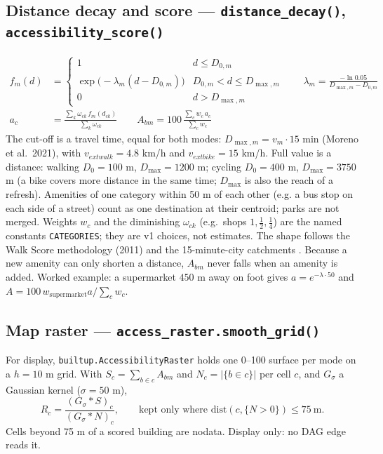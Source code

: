 \documentclass[11pt]{article}
\newcommand{\code}[1]{\texttt{#1}}
\begin{document}
\subsection{Distance decay and score --- \code{distance\_decay()}, \code{accessibility\_score()}}
\begin{align}
  f_m(d) &= \begin{cases} 1 & d \le D_{0,m} \\ \exp\!\big(-\lambda_m (d - D_{0,m})\big) & D_{0,m} < d \le D_{\max,m} \\ 0 & d > D_{\max,m} \end{cases}
  \qquad \lambda_m = \frac{-\ln 0.05}{D_{\max,m} - D_{0,m}} \\
  a_c &= \frac{\sum_{k} \omega_{ck}\, f_m(d_{ck})}{\sum_{k} \omega_{ck}} \qquad
  A_{bm} = 100\, \frac{\sum_c w_c\, a_c}{\sum_c w_c}
\end{align}
The cut-off is a travel time, equal for both modes: $D_{\max,m} = v_m \cdot 15$ min (Moreno et al.\ 2021), with $v_{	ext{walk}} = 4.8$ km/h and $v_{	ext{bike}} = 15$ km/h. Full value is a distance: walking $D_0 = 100$ m, $D_{\max} = 1200$ m; cycling $D_0 = 400$ m, $D_{\max} = 3750$ m (a bike covers more distance in the same time; $D_{\max}$ is also the reach of a refresh). Amenities of one category within 50 m of each other (e.g. a bus stop on each side of a street) count as one destination at their centroid; parks are not merged. Weights $w_c$ and the diminishing $\omega_{ck}$ (e.g.\ shops $1, \tfrac12, \tfrac14$) are the named constants \code{CATEGORIES}; they are v1 choices, not estimates. The shape follows the Walk Score methodology (2011) and the 15-minute-city catchments \cite{Moreno2021}. Because a new amenity can only shorten a distance, $A_{bm}$ never falls when an amenity is added. Worked example: a supermarket $450$ m away on foot gives $a = e^{-\lambda \cdot 50}$ and $A = 100\, w_{\text{supermarket}} a / \sum_c w_c$.

\subsection{Map raster --- \code{access\_raster.smooth\_grid()}}
For display, \code{builtup.AccessibilityRaster} holds one 0--100 surface per mode on a $h = 10$ m grid. With $S_c = \sum_{b \in c} A_{bm}$ and $N_c = |\{b \in c\}|$ per cell $c$, and $G_\sigma$ a Gaussian kernel ($\sigma = 50$ m),
\begin{equation}
  R_{c} = \frac{(G_\sigma * S)_c}{(G_\sigma * N)_c}, \qquad \text{kept only where } \mathrm{dist}(c, \{N > 0\}) \le 75\ \text{m}.
\end{equation}
Cells beyond 75 m of a scored building are nodata. Display only: no DAG edge reads it.
\end{document}
